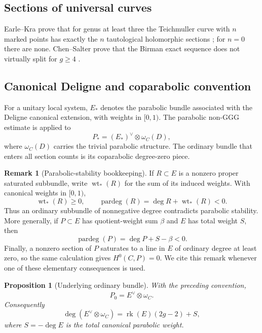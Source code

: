 \documentclass[11pt]{article}
\newtheorem{proposition}[theorem]{Proposition}
\theoremstyle{definition}
\newtheorem{remark}[theorem]{Remark}
\newcommand{\rk}{\operatorname{rk}}
\newcommand{\degp}{\operatorname{pardeg}}
\begin{document}
\subsection{Sections of universal curves}

Earle--Kra prove that for genus at least three the Teichmuller curve with $n$
marked points has exactly the $n$ tautological holomorphic sections
\cite{EarleKra}; for $n=0$ there are none.  Chen--Salter prove that the Birman
exact sequence does not virtually split for $g\ge4$ \cite{ChenSalter}.

\subsection{Canonical Deligne and coparabolic convention}

For a unitary local system, $E_*$ denotes the parabolic bundle associated
with the Deligne canonical extension, with weights in $[0,1)$.  The
parabolic non-GGG estimate is applied to
\[
 P_*=(E_*)^\vee\otimes\omega_C(D),
\]
where $\omega_C(D)$ carries the trivial parabolic structure.  The ordinary
bundle that enters all section counts is its coparabolic degree-zero piece.

\begin{remark}[Parabolic-stability bookkeeping]
\label{rem:stability-bookkeeping}
If $R\subset E$ is a nonzero proper saturated subbundle, write
$\operatorname{wt}_*(R)$ for the sum of its induced weights.  With canonical weights in
$[0,1)$,
\[
 \operatorname{wt}_*(R)\ge0,
 \qquad
 \degp(R)=\deg R+\operatorname{wt}_*(R)<0.
 \tag{2.1}
\]
Thus an ordinary subbundle of nonnegative degree contradicts parabolic
stability.  More generally, if $P\subset E$ has quotient-weight sum $\beta$
and $E$ has total weight $S$, then
\[
 \degp(P)=\deg P+S-\beta<0.
 \tag{2.2}
\]
Finally, a nonzero section of $P$ saturates to a line in $E$ of ordinary
degree at least zero, so the same calculation gives $H^0(C,P)=0$.  We cite
this remark whenever one of these elementary consequences is used.
\end{remark}

\begin{proposition}[Underlying ordinary bundle]\label{prop:coparabolic-bundle}
With the preceding convention,
\[
 \widehat P_0=E^\vee\otimes\omega_C.
\]
Consequently
\[
 \deg(E^\vee\otimes\omega_C)=\rk(E)(2g-2)+S,
\]
where $S=-\deg E$ is the total canonical parabolic weight.
\end{proposition}
\end{document}
